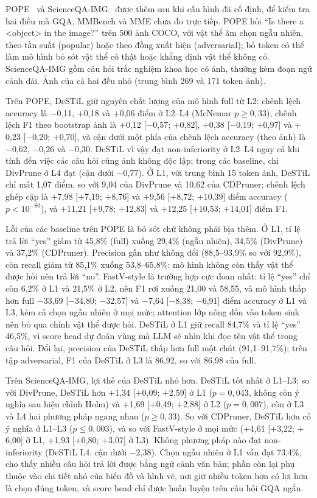 \documentclass[conference]{IEEEtran}
\newcommand{\mi}{\ensuremath{-}}            %
\newcommand{\pl}{\ensuremath{+}}
\begin{document}
POPE~\cite{li2023pope} và ScienceQA-IMG~\cite{lu2022scienceqa} được thêm sau khi cấu hình đã cố định, để kiểm tra hai điều mà GQA, MMBench và MME chưa đo trực tiếp. POPE hỏi ``Is there a \textless object\textgreater{} in the image?'' trên 500 ảnh COCO, với vật thể âm chọn ngẫu nhiên, theo tần suất (popular) hoặc theo đồng xuất hiện (adversarial); bỏ token có thể làm mô hình bỏ sót vật thể có thật hoặc khẳng định vật thể không có. ScienceQA-IMG gồm câu hỏi trắc nghiệm khoa học có ảnh, thường kèm đoạn ngữ cảnh dài. Ảnh của cả hai đều nhỏ (trung bình 269 và 171 token ảnh).

Trên POPE, DeSTiL giữ nguyên chất lượng của mô hình full từ L2: chênh lệch accuracy là \mi0,11, \pl0,18 và \pl0,06 điểm ở L2--L4 (McNemar $p\ge0{,}33$), chênh lệch F1 theo bootstrap ảnh là \pl0,12 [\mi0,57; \pl0,82], \pl0,38 [\mi0,19; \pl0,97] và \pl0,23 [\mi0,20; \pl0,70], và cận dưới một phía của chênh lệch accuracy (theo ảnh) là \mi0,62, \mi0,26 và \mi0,30. DeSTiL vì vậy đạt non-inferiority ở L2--L4 ngay cả khi tính đến việc các câu hỏi cùng ảnh không độc lập; trong các baseline, chỉ DivPrune ở L4 đạt (cận dưới \mi0,77). Ở L1, với trung bình 15 token ảnh, DeSTiL chỉ mất 1,07 điểm, so với 9,04 của DivPrune và 10,62 của CDPruner; chênh lệch ghép cặp là \pl7,98 [\pl7,19; \pl8,76] và \pl9,56 [\pl8,72; \pl10,39] điểm accuracy ($p<10^{-80}$), và \pl11,21 [\pl9,78; \pl12,83] và \pl12,25 [\pl10,53; \pl14,01] điểm F1.

Lỗi của các baseline trên POPE là bỏ sót chứ không phải bịa thêm. Ở L1, tỉ lệ trả lời ``yes'' giảm từ 45,8\% (full) xuống 29,4\% (ngẫu nhiên), 34,5\% (DivPrune) và 37,2\% (CDPruner). Precision gần như không đổi (88,5--93,9\% so với 92,9\%), còn recall giảm từ 85,1\% xuống 53,8--65,8\%: mô hình không còn thấy vật thể được hỏi nên trả lời ``no''. FastV-style là trường hợp cực đoan nhất: tỉ lệ ``yes'' chỉ còn 6,2\% ở L1 và 21,5\% ở L2, nên F1 rơi xuống 21,00 và 58,55, và mô hình thấp hơn full \mi33,69 [\mi34,80; \mi32,57] và \mi7,64 [\mi8,38; \mi6,91] điểm accuracy ở L1 và L3, kém cả chọn ngẫu nhiên ở mọi mức; attention lớp nông dồn vào token sink nên bỏ qua chính vật thể được hỏi. DeSTiL ở L1 giữ recall 84,7\% và tỉ lệ ``yes'' 46,5\%, vì score head dự đoán vùng mà LLM sẽ nhìn khi đọc tên vật thể trong câu hỏi. Đổi lại, precision của DeSTiL thấp hơn full một chút (91,1--91,7\%); trên tập adversarial, F1 của DeSTiL ở L3 là 86,92, so với 86,98 của full.

Trên ScienceQA-IMG, lợi thế của DeSTiL nhỏ hơn. DeSTiL tốt nhất ở L1--L3; so với DivPrune, DeSTiL hơn \pl1,34 [\pl0,09; \pl2,59] ở L1 ($p=0{,}043$, không còn ý nghĩa sau hiệu chỉnh Holm) và \pl1,69 [\pl0,49; \pl2,88] ở L2 ($p=0{,}007$), còn ở L3 và L4 hai phương pháp ngang nhau ($p\ge0{,}33$). So với CDPruner, DeSTiL hơn có ý nghĩa ở L1--L3 ($p\le0{,}003$), và so với FastV-style ở mọi mức (\pl4,61 [\pl3,22; \pl6,00] ở L1, \pl1,93 [\pl0,80; \pl3,07] ở L3). Không phương pháp nào đạt non-inferiority (DeSTiL L4: cận dưới \mi2,38). Chọn ngẫu nhiên ở L1 vẫn đạt 73,4\%, cho thấy nhiều câu hỏi trả lời được bằng ngữ cảnh văn bản; phần còn lại phụ thuộc vào chi tiết nhỏ của biểu đồ và hình vẽ, nơi giữ nhiều token hơn có lợi hơn là chọn đúng token, và score head chỉ được huấn luyện trên câu hỏi GQA ngắn.
\end{document}
